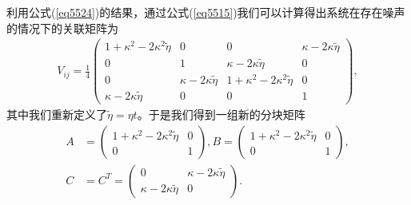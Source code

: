 利用公式(\ref{eq5524})的结果，通过公式(\ref{eq5515})我们可以计算得出系统在存在噪声的情况下的关联矩阵为 
\begin{align}\label{eq5525}
	{V_{ij}} =\frac14 \left( 
	{
		\begin{array}{*{20}{c}}
			1+\kappa^2 - 2\kappa^2\tilde \eta &    0   &    0       & \kappa- 2\kappa\tilde \eta \\
			0      &    1   & \kappa- 2\kappa\tilde \eta     &    0   \\
			0      & \kappa- 2\kappa\tilde \eta & 1+\kappa^2- 2\kappa^2\tilde \eta &    0   \\
			\kappa- 2\kappa\tilde \eta   &    0   &    0       &    1
		\end{array}
	} 
	\right),
\end{align}
其中我们重新定义了$\tilde \eta  = \eta t$。于是我们得到一组新的分块矩阵
\begin{align}\label{eq5526}
	A&=\left(
	{
		\begin{array}{*{20}{cc}}
			1+\kappa^2 - 2\kappa^2\tilde \eta  & 0\\
			0        & 1
		\end{array}
	} 
	\right),
	B=\left(
	{
		\begin{array}{*{20}{cc}}
			1+\kappa^2 - 2\kappa^2\tilde \eta  & 0\\
			0        & 1
		\end{array}
	} 
	\right),\\
	C&=C^T=\left(
	{
		\begin{array}{*{20}{cc}}
			0       & \kappa- 2\kappa\tilde \eta\\
			\kappa- 2\kappa\tilde \eta     &   0 
		\end{array}
	} 
	\right).
\end{align}

